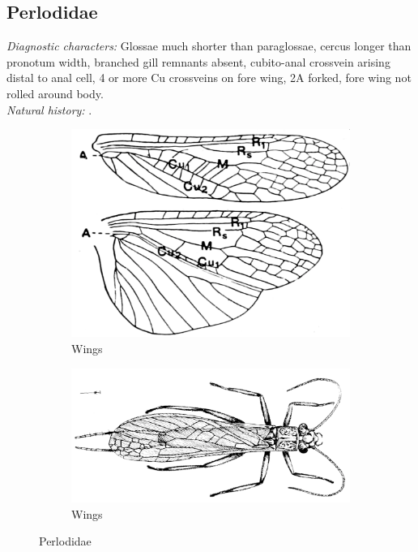 \documentclass[letterpaper, 11pt]{article}
\begin{document}
\subsection{Perlodidae}
\noindent{}\textit{Diagnostic characters:} Glossae much shorter than paraglossae, cercus longer than pronotum width, branched gill remnants absent, cubito-anal crossvein arising distal to anal cell, 4 or more Cu crossveins on fore wing, 2A forked, fore wing not rolled around body.\\

\noindent{}\textit{Natural history:} .\\

\begin{figure}[ht!]
    \centering
    \begin{subfigure}[ht!]{0.4\textwidth}
        \includegraphics[width=\textwidth]{PerlodidWings}
        \caption{Wings \citep[modified from][Plate 9, Fig. 1]{bhl29875}}
        \label{fig:perlodid1}
    \end{subfigure}
    \qquad
    \begin{subfigure}[ht!]{0.5\textwidth}
        \includegraphics[width=\textwidth]{PerlodidHabitus}
        \caption{Wings \citep[modified from][Fig. 12]{bhl29875}}
        \label{fig:perlodid2}
    \end{subfigure}
    \caption{Perlodidae}\label{fig:perlodids}
\end{figure}
\end{document}

